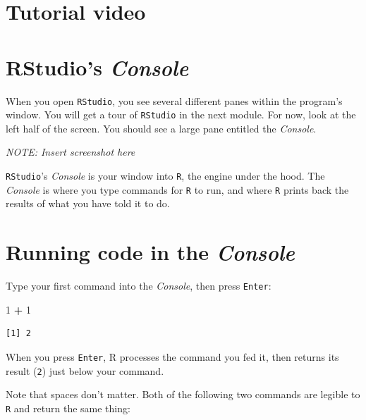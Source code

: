 \documentclass[
]{book}
\newenvironment{Shaded}{\begin{snugshade}}{\end{snugshade}}
\newcommand{\DecValTok}[1]{\textcolor[rgb]{0.00,0.00,0.81}{#1}}
\newcommand{\OperatorTok}[1]{\textcolor[rgb]{0.81,0.36,0.00}{\textbf{#1}}}
\newcommand{\StringTok}[1]{\textcolor[rgb]{0.31,0.60,0.02}{#1}}
\begin{document}
\hypertarget{tutorial-video}{%
\section*{Tutorial video}\label{tutorial-video}}

\hypertarget{rstudios-console}{%
\section*{\texorpdfstring{RStudio's \emph{Console}}{RStudio's Console}}\label{rstudios-console}}

When you open \texttt{RStudio}, you see several different panes within the program's window. You will get a tour of \texttt{RStudio} in the next module. For now, look at the left half of the screen. You should see a large pane entitled the \emph{Console}.

\emph{NOTE: Insert screenshot here}

\texttt{RStudio}'s \emph{Console} is your window into \texttt{R}, the engine under the hood. The \emph{Console} is where you type commands for \texttt{R} to run, and where \texttt{R} prints back the results of what you have told it to do.

\hypertarget{running-code-in-the-console}{%
\section*{\texorpdfstring{Running code in the \emph{Console}}{Running code in the Console}}\label{running-code-in-the-console}}

Type your first command into the \emph{Console}, then press \texttt{Enter}:

\begin{Shaded}
\begin{Highlighting}[]
\DecValTok{1} \OperatorTok{+}\StringTok{ }\DecValTok{1}
\end{Highlighting}
\end{Shaded}

\begin{verbatim}
[1] 2
\end{verbatim}

When you press \texttt{Enter}, R processes the command you fed it, then returns its result (\texttt{2}) just below your command.

Note that spaces don't matter. Both of the following two commands are legible to \texttt{R} and return the same thing:
\end{document}
